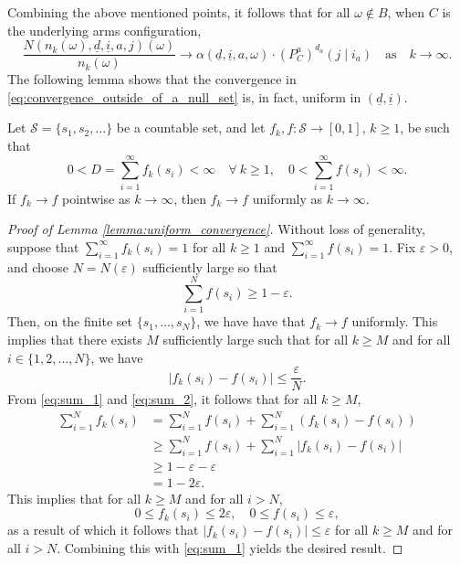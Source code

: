Combining the above mentioned points, it follows that for all $\omega\notin B$, when $C$ is the underlying arms configuration,
    \begin{equation}
    	\frac{N(n_k(\omega), \underline{d}, \underline{i}, a, j)(\omega)}{n_k(\omega)} \longrightarrow \alpha(\underline{d}, \underline{i}, a, \omega)\cdot  (P_C^a)^{d_a}(j\mid i_a)\quad \text{as}\quad k\to \infty.
    	\label{eq:convergence_outside_of_a_null_set}
    \end{equation}
The following lemma shows that the convergence in  \eqref{eq:convergence_outside_of_a_null_set} is, in fact, uniform in $(\underline{d}, \underline{i})$. 
\begin{lemma}
\label{lemma:uniform_convergence}
	{\color{black} Let $\mathscr{S}=\{s_{1}, s_{2}, \ldots\}$ be a countable set, and let $f_k, f:\mathscr{S}\to [0,1]$, $k\geq 1$, be such that $$0<D=\sum\limits_{i=1}^{\infty} f_k(s_{i})<\infty\quad \forall ~k\geq 1,\quad 0<\sum\limits_{i=1}^{\infty} f(s_{i})<\infty.$$
	If $f_k\to f$ pointwise as $k\to \infty$, then $f_k\to f$ uniformly as $k\to \infty$.}
\end{lemma}
{\color{black} \begin{proof}[Proof of Lemma \ref{lemma:uniform_convergence}]
 Without loss of generality, suppose that $\sum\limits_{i=1}^{\infty} f_k(s_{i})=1$ for all $k\geq 1$ and $\sum\limits_{i=1}^{\infty} f(s_{i})=1$. Fix $\varepsilon>0$, and choose $N=N(\varepsilon)$ sufficiently large so that 
\begin{equation}
	\sum\limits_{i=1}^{N}f(s_{i})\geq 1-\varepsilon.
	\label{eq:sum_1}
\end{equation}
Then, on the finite set $\{s_{1}, \ldots, s_{N}\}$, we have have that $f_{k}\to f$ uniformly. This implies that there exists $M$ sufficiently large such that for all $k\geq M$ and for all $i\in \{1, 2, \ldots, N\}$, we have 
\begin{equation}
	|f_{k}(s_{i})-f(s_{i})|\leq \frac{\varepsilon}{N}.
	\label{eq:sum_2}
\end{equation}
From \eqref{eq:sum_1} and \eqref{eq:sum_2}, it follows that for all $k\geq M$, 
\begin{align}
	\sum\limits_{i=1}^{N}f_{k}(s_{i})&=\sum\limits_{i=1}^{N}f(s_{i})+\sum\limits_{i=1}^{N} (f_{k}(s_{i})-f(s_{i}))\nonumber\\
	&\geq \sum\limits_{i=1}^{N}f(s_{i})+\sum\limits_{i=1}^{N} |f_{k}(s_{i})-f(s_{i})|\nonumber\\
	&\geq 1-\varepsilon - \varepsilon\nonumber\\
	&=1-2\varepsilon.
\end{align}
This implies that for all $k\geq M$ and for all $i>N$, 
\begin{equation}
	0\leq f_{k}(s_{i})\leq 2\varepsilon, \quad 0\leq f(s_{i})\leq \varepsilon,
\end{equation}
as a result of which it follows that $|f_{k}(s_{i})-f(s_{i})|\leq \varepsilon$ for all  $k\geq M$ and for all $i>N$. Combining this with \eqref{eq:sum_1} yields the desired result.  
\end{proof}}
